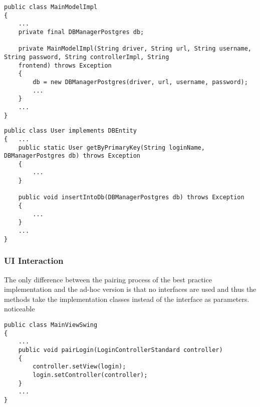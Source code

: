 \begin{lstlisting}[caption={Code snippet showing how the DBManager is instantiated. Again no interfaces but rather concrete implementations are used. The singleton class seen in listing \ref{lst:dbmanager} does not exist in the ad-hoc version.}, captionpos=b]
public class MainModelImpl
{
	...
	private final DBManagerPostgres db;
	
	private MainModelImpl(String driver, String url, String username, String password, String controllerImpl, String
	frontend) throws Exception
	{
		db = new DBManagerPostgres(driver, url, username, password);
		...
	}
	...
}
\end{lstlisting}

\begin{lstlisting}[caption={Code snippet showing a database access methods in a data class. The retrieval method takes arguments necessary for the query and the database-manager object as parameters and is static, while the update method is not static and therefore performs the operation on the current object instance.}, captionpos=b, label={lst:static-methods}]
public class User implements DBEntity
{	...
	public static User getByPrimaryKey(String loginName, DBManagerPostgres db) throws Exception
	{
		...
	}
	
	public void insertIntoDb(DBManagerPostgres db) throws Exception
	{
		...
	}
	...
}
\end{lstlisting}

\subsubsection{UI Interaction}
The only difference between the pairing process of the best practice implementation and the ad-hoc version is that no interfaces are used and thus the methods take the implementation  classes instead of the interface as parameters. 
noticeable 
\begin{lstlisting}[caption={Code snippet showing pairing code of the ad-hoc version of the program. It is noticeable that the pairing method takes a concrete implementation rather than an interface as a parameter. This differs from the best practice version seen in \ref{lst:pairing} which takes only the interface as parameter.}, captionpos=b]
public class MainViewSwing
{
	...
	public void pairLogin(LoginControllerStandard controller)
	{
		controller.setView(login);
		login.setController(controller);
	}
	...
}
\end{lstlisting}

